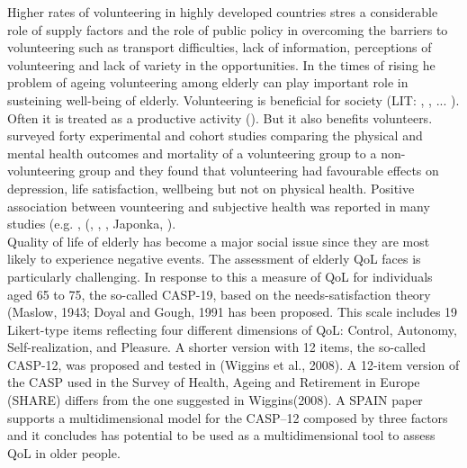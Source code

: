 \documentclass[10pt, letterpaper]{article}
\begin{document}
\begin{spacing}{1.4}
Higher rates of volunteering in  highly developed countries stres a considerable role of supply factors and the role of public policy in overcoming the barriers to volunteering such as transport difficulties, lack of information, perceptions of volunteering and lack of variety in the opportunities. In the times of rising he problem of ageing volunteering among elderly can play important role in susteining well-being of elderly. Volunteering is beneficial for society (LIT: \citet{Oecd15}, \cite{prouteau06}, ... ). Often it is treated as a productive activity (\citet{hank09}). But it also benefits volunteers. \citet{jenkinson2013volunteering} surveyed forty experimental and cohort studies comparing the physical and mental health outcomes and mortality of a volunteering group to a non-volunteering group and they found that volunteering had favourable effects on depression, life satisfaction, wellbeing but not on physical health. Positive association between vounteering and subjective health was reported in many studies (e.g. \citet{borgonovi08}, (\cite{anderson14}, \cite{li06}, \cite{VanWilligen00}, Japonka,  \citet{detollenaere17}). \\

Quality of life  of elderly has become a major social issue since they are most likely to experience negative events. The assessment of elderly QoL faces is particularly challenging. In response to this a measure of QoL for individuals aged 65 to 75, the so-called CASP-19, based on the needs-satisfaction theory (Maslow, 1943; Doyal and Gough, 1991 has been proposed. This scale includes 19 Likert-type items reflecting four different dimensions of QoL: Control, Autonomy, Self-realization, and Pleasure. A shorter version with 12 items, the so-called CASP-12, was proposed and tested in (Wiggins et al., 2008). A 12-item version of the CASP used in the Survey of Health, Ageing and Retirement in Europe (SHARE) differs from the one suggested in Wiggins(2008). A SPAIN paper supports a multidimensional model for the CASP–12 composed by three factors and it concludes has potential to be used as a multidimensional tool to assess QoL in older people. \\


\end{spacing}
\end{document}
